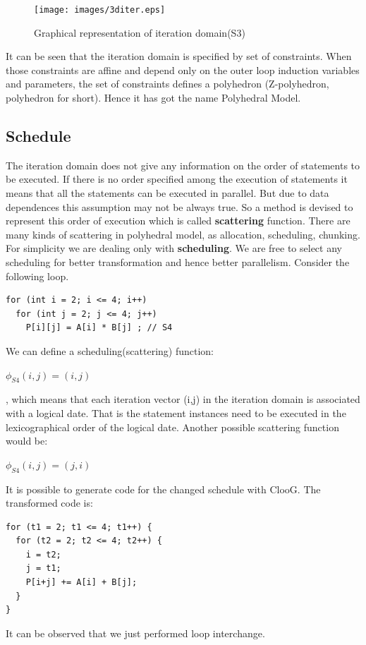 \begin{figure}
\begin{center}
  \texttt{[image: images/3diter.eps]}
  \caption{Graphical representation of iteration domain(S3)}
  \label{fig:3diter}
\end{center}  
\end{figure}


It can be seen that the iteration domain is specified by set of constraints. When those constraints are
affine and depend only on the outer loop induction variables and parameters, the set of constraints
defines a polyhedron (Z-polyhedron, polyhedron for short). Hence it has got the name Polyhedral Model.

\subsection{Schedule}

The iteration domain does not give any information on the order of statements to be executed. If there
is no order specified among the execution of statements it means that all the statements can be executed
in parallel. But due to data dependences this assumption may not be always true. So a method is devised
to represent this order of execution which is called \textbf{scattering} function. There are many
kinds of scattering in polyhedral model, as allocation, scheduling, chunking. For simplicity
we are dealing only with \textbf{scheduling}. We are free to select any scheduling for better
transformation and hence better parallelism.
Consider the following loop.
{\footnotesize
\begin{lstlisting}
for (int i = 2; i <= 4; i++)
  for (int j = 2; j <= 4; j++)
    P[i][j] = A[i] * B[j] ; // S4
\end{lstlisting}
}
\noindent
We can define a scheduling(scattering) function:
\begin{center}
$\phi_{S4}(i,j) = (i,j)$
\end{center}, which means that each iteration vector (i,j) in the iteration domain is associated with
a logical date. That is the statement instances need to be executed in the lexicographical order of the
logical date. Another possible scattering function would be:
\begin{center}
$\phi_{S4}(i,j) = (j,i)$
\end{center}
\noindent
It is possible to generate code for the changed schedule with ClooG\cite{cloog}. The
transformed code is:
{\footnotesize
\begin{lstlisting}
for (t1 = 2; t1 <= 4; t1++) {
  for (t2 = 2; t2 <= 4; t2++) {
    i = t2;
    j = t1;
    P[i+j] += A[i] + B[j];
  }
}
\end{lstlisting}
}
\noindent
It can be observed that we just performed loop interchange.
